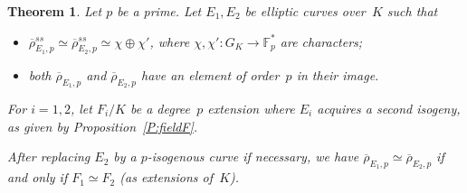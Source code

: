 \documentclass[twoside,leqno,symbols-for-thanks, draft]{rmi}
\numberwithin{equation}{section}
\newcommand{\Fpstar}{\mathbb{F}_p^*}
\newcommand{\rhobar}{{\overline{\rho}}}
\newtheorem{theorem}{Theorem}[section]
\theoremstyle{remark}
\begin{document}
\begin{theorem} \label{T:reducible}
Let $p$ be a prime. Let $E_1, E_2$ be elliptic curves over~$K$ such
that
\begin{itemize}
 \item[(i)] $\rhobar_{E_1,p}^{ss} \simeq \rhobar_{E_2,p}^{ss} \simeq \chi \oplus \chi'$,  where $\chi, \chi' : G_K \to \Fpstar$ are characters;
 \item[(ii)] both $\rhobar_{E_1,p}$ and $\rhobar_{E_2,p}$ have an element of
 order~$p$ in their image.
\end{itemize}
For $i=1,2$, let $F_i/K$ be a degree~$p$ extension where $E_i$
acquires a second isogeny, as given by Proposition~\ref{P:fieldF}.

After replacing $E_2$ by a $p$-isogenous curve if necessary, we have
$\rhobar_{E_1,p} \simeq \rhobar_{E_2,p}$ if and only if $F_1 \simeq
F_2$ (as extensions of~$K$).
\end{theorem}
\end{document}
